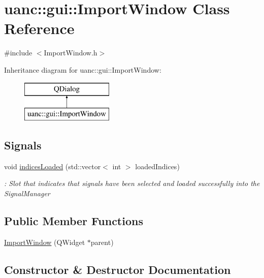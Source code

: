 \hypertarget{classuanc_1_1gui_1_1_import_window}{}\section{uanc\+:\+:gui\+:\+:Import\+Window Class Reference}
\label{classuanc_1_1gui_1_1_import_window}


{\ttfamily \#include $<$Import\+Window.\+h$>$}

Inheritance diagram for uanc\+:\+:gui\+:\+:Import\+Window\+:\begin{figure}[H]
\begin{center}
\leavevmode
\includegraphics[height=2.000000cm]{classuanc_1_1gui_1_1_import_window}
\end{center}
\end{figure}
\subsection*{Signals}
\begin{DoxyCompactItemize}
\item 
void \hyperlink{classuanc_1_1gui_1_1_import_window_ac355137ecc8de30b572c3e1df7a16b81}{indices\+Loaded} (std\+::vector$<$ int $>$ loaded\+Indices)
\begin{DoxyCompactList}\small\item\em \+: Slot that indicates that signals have been selected and loaded successfully into the Signal\+Manager \end{DoxyCompactList}\end{DoxyCompactItemize}
\subsection*{Public Member Functions}
\begin{DoxyCompactItemize}
\item 
\hyperlink{classuanc_1_1gui_1_1_import_window_a812ba3dd89d0f90774dd5089a499a98b}{Import\+Window} (Q\+Widget $\ast$parent)
\end{DoxyCompactItemize}


\subsection{Constructor \& Destructor Documentation}

